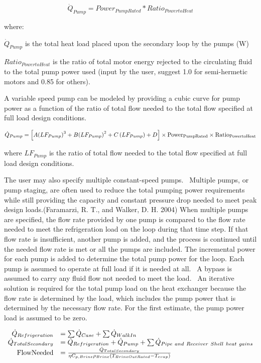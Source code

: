 \begin{equation}
{\dot Q_{Pump}} = Power_{PumpRated} * Ratio_{PowertoHeat}
\end{equation}

where:

\({\dot Q_{Pump}}\) is the total heat load placed upon the secondary loop by the pumps (W)

\(Ratio_{PowertoHeat}\) is the ratio of total motor energy rejected to the circulating fluid to the total pump power used (input by the user, suggest 1.0 for semi-hermetic motors and 0.85 for others).

A variable speed pump can be modeled by providing a cubic curve for pump power as a function of the ratio of total flow needed to the total flow specified at full load design conditions.

\begin{equation}
{\dot Q_{Pump}} = \left[ {A{{\left( {L{F_{Pump}}} \right)}^3} + B{{\left( {L{F_{Pump}}} \right)}^2} + C\left( {L{F_{Pump}}} \right) + D} \right] \times {\rm{Powe}}{{\rm{r}}_{{\rm{PumpRated}}}} \times {\rm{Rati}}{{\rm{o}}_{{\rm{PowertoHeat}}}}
\end{equation}

where \(LF_{Pump}\) is the ratio of total flow needed to the total flow specified at full load design conditions.

The user may also specify multiple constant-speed pumps.~ Multiple pumps, or pump staging, are often used to reduce the total pumping power requirements while still providing the capacity and constant pressure drop needed to meet peak design loads.(Faramarzi, R. T., and Walker, D. H. 2004) When multiple pumps are specified, the flow rate provided by one pump is compared to the flow rate needed to meet the refrigeration load on the loop during that time step. If that flow rate is insufficient, another pump is added, and the process is continued until the needed flow rate is met or all the pumps are included. The incremental power for each pump is added to determine the total pump power for the loop. Each pump is assumed to operate at full load if it is needed at all.~ A bypass is assumed to carry any fluid flow not needed to meet the load.~ An iterative solution is required for the total pump load on the heat exchanger because the flow rate is determined by the load, which includes the pump power that is determined by the necessary flow rate. For the first estimate, the pump power load is assumed to be zero.

\begin{equation}
  \begin{array}{rl}
    \dot{Q}_{Refrigeration} &= \sum \dot{Q}_{Case} + \sum \dot{Q}_{WalkIn} \\
    \dot{Q}_{TotalSecondary} &= \dot{Q}_{Refrigeration} + \dot{Q}_{Pump} + \sum \dot{Q}_{Pipe~and~Receiver~Shell~heat~gains} \\
    \text{FlowNeeded} &= \frac{\dot{Q}_{TotalSecondary}}{\eta C_{p,Brine} \rho_{Brine}\left(T_{BrineOutRated} - T_{evap}\right)}
  \end{array}
\end{equation}

